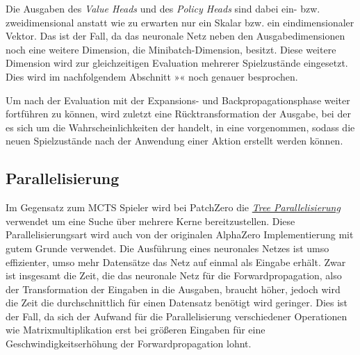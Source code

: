 \vspace*{-0.1cm}

\vspace*{-0.2cm}

Die Ausgaben des \emph{Value Heads} und des \emph{Policy Heads} sind dabei ein- bzw. zweidimensional anstatt wie zu erwarten nur ein Skalar bzw. ein eindimensionaler Vektor. Das ist der Fall, da das neuronale Netz neben den Ausgabedimensionen noch eine weitere Dimension, die Minibatch-Dimension, besitzt. Diese weitere Dimension wird zur gleichzeitigen Evaluation mehrerer Spielzustände eingesetzt. Dies wird im nachfolgendem Abschnitt »« noch genauer besprochen.

\vspace*{-5cm}
\pagebreak

Um nach der Evaluation mit der Expansions- und Backpropagationsphase weiter fortführen zu können, wird zuletzt eine Rücktransformation der Ausgabe, bei der es sich um die Wahrscheinlichkeiten der \hyperref[text:natural-action-id]{} handelt, in eine \hyperref[text:action-id]{} vorgenommen, sodass die neuen Spielzustände nach der Anwendung einer Aktion erstellt werden können.

\subsection{Parallelisierung}
\label{section:erstellung-ansatz-d-parallelisierung}

Im Gegensatz zum \ac{MCTS} Spieler wird bei PatchZero die \hyperref[text:tree-parallelization]{\emph{Tree Parallelisierung}} verwendet um eine Suche über mehrere Kerne bereitzustellen. Diese Parallelisierungsart wird auch von der originalen AlphaZero Implementierung mit gutem Grunde verwendet. Die Ausführung eines neuronales Netzes ist umso effizienter, umso mehr Datensätze das Netz auf einmal als Eingabe erhält. Zwar ist insgesamt die Zeit, die das neuronale Netz für die Forwardpropagation, also der Transformation der Eingaben in die Ausgaben, braucht höher, jedoch wird die Zeit die durchschnittlich für einen Datensatz benötigt wird geringer. Dies ist der Fall, da sich der Aufwand für die Parallelisierung verschiedener Operationen wie Matrixmultiplikation erst bei größeren Eingaben für eine Geschwindigkeitserhöhung der Forwardpropagation lohnt.

